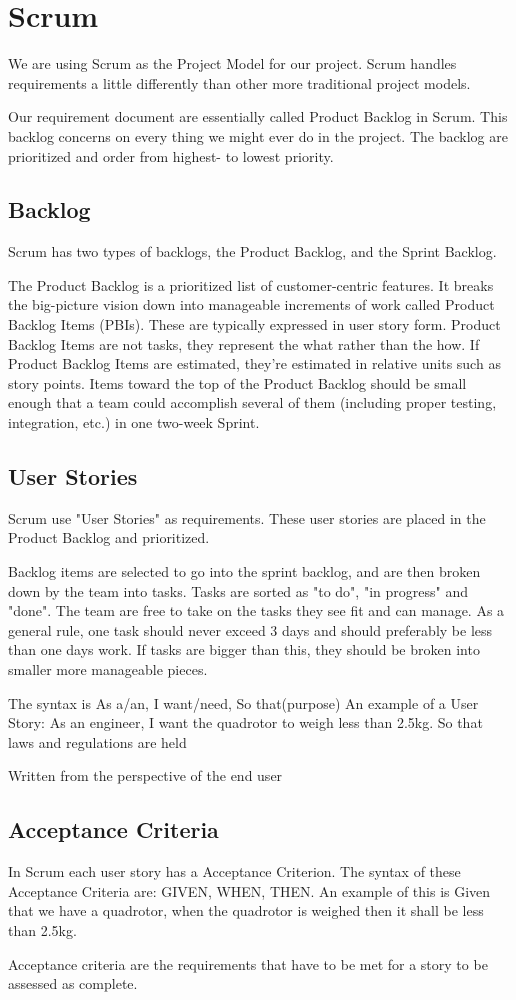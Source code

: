 \section{Scrum}
We are using Scrum as the Project Model for our project. Scrum handles requirements a little differently than other more traditional project models.  


Our requirement document are essentially called Product Backlog in Scrum. This backlog concerns on every thing we might ever do in the project. 
The backlog are prioritized and order from highest- to lowest priority.


\subsection{Backlog}

Scrum has two types of backlogs, the Product Backlog, and the Sprint Backlog.


The Product Backlog is a prioritized list of customer-centric features. It breaks the big-picture vision down into manageable increments of work called Product Backlog Items (PBIs). These are typically expressed in user story form. Product Backlog Items are not tasks, they represent the what rather than the how. If Product Backlog Items are estimated, they’re estimated in relative units such as story points. Items toward the top of the Product Backlog should be small enough that a team could accomplish several of them (including proper testing, integration, etc.) in one two-week Sprint.


\subsection{User Stories}
Scrum use "User Stories" as requirements. These user stories are placed in the Product Backlog and prioritized. 

Backlog items are selected to go into the sprint backlog, and are then broken down by the team into tasks. Tasks are sorted as "to do", "in progress" and "done". The team are free to take on the tasks they see fit and can manage. As a general rule, one task should never exceed 3 days and should preferably be less than one days work. If tasks are bigger than this, they should be broken into smaller more manageable pieces.

The syntax is As a/an, I want/need, So that(purpose) 
An example of a User Story: As an engineer, I want the quadrotor to weigh less than 2.5kg. So that laws and regulations are held 

Written from the perspective of the end user

\subsection{Acceptance Criteria}
In Scrum each user story has a Acceptance Criterion. The syntax of these Acceptance Criteria are: GIVEN, WHEN, THEN. An example of this is Given that we have a quadrotor, when the quadrotor is weighed then it shall be less than 2.5kg.


 Acceptance criteria are the requirements that have to be met for a story to be assessed as complete.

